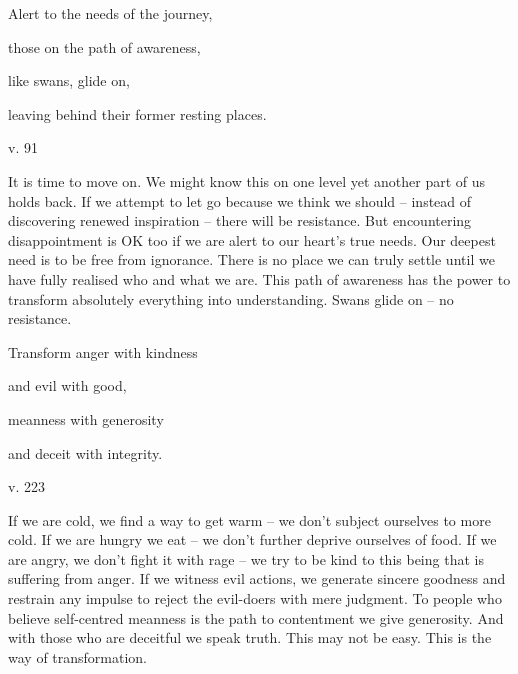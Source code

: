 \documentclass[a4paper,portrait,12pt]{article}
\begin{document}
Alert to the needs of the journey,


those on the path of awareness,


like swans, glide on,


leaving behind their former resting places.





v. 91





It is time to move on. We might know this on one level yet another part of us holds back. If we attempt to let go because we think we should -- instead of discovering renewed inspiration -- there will be resistance. But encountering disappointment is OK too if we are alert to our heart's true needs. Our deepest need is to be free from ignorance. There is no place we can truly settle until we have fully realised who and what we are. This path of awareness has the power to transform absolutely everything into understanding. Swans glide on -- no resistance.














Transform anger with kindness 


and evil with good,


meanness with generosity


and deceit with integrity.





v. 223





If we are cold, we find a way to get warm -- we don't subject ourselves to more cold. If we are hungry we eat -- we don't further deprive ourselves of food. If we are angry, we don't fight it with rage -- we try to be kind to this being that is suffering from anger. If we witness evil actions, we generate sincere goodness and restrain any impulse to reject the evil-doers with mere judgment. To people who believe self-centred meanness is the path to contentment we give generosity. And with those who are deceitful we speak truth. This may not be easy. This is the way of transformation.
\end{document}
